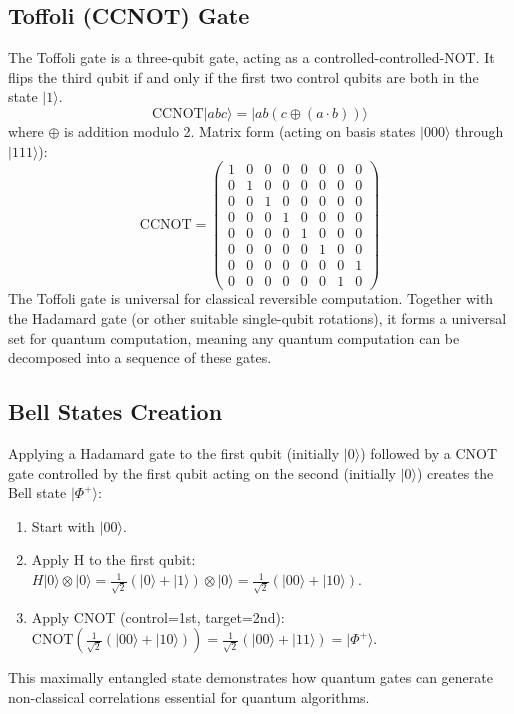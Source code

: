 \subsection*{Toffoli (CCNOT) Gate}
The Toffoli gate is a three-qubit gate, acting as a controlled-controlled-NOT. It flips the third qubit if and only if the first two control qubits are both in the state $|1\rangle$.
\begin{equation*}
    \text{CCNOT}|abc\rangle = |ab(c\oplus(a\cdot b))\rangle
\end{equation*}
where $\oplus$ is addition modulo 2.
Matrix form (acting on basis states $|000\rangle$ through $|111\rangle$):
\begin{equation*}
    \text{CCNOT} = \begin{pmatrix}
    1&0&0&0&0&0&0&0 \\
    0&1&0&0&0&0&0&0 \\
    0&0&1&0&0&0&0&0 \\
    0&0&0&1&0&0&0&0 \\
    0&0&0&0&1&0&0&0 \\
    0&0&0&0&0&1&0&0 \\
    0&0&0&0&0&0&0&1 \\ %
    0&0&0&0&0&0&1&0  %
    \end{pmatrix}
\end{equation*}
The Toffoli gate is universal for classical reversible computation. Together with the Hadamard gate (or other suitable single-qubit rotations), it forms a universal set for quantum computation, meaning any quantum computation can be decomposed into a sequence of these gates.

\subsection*{Bell States Creation}
Applying a Hadamard gate to the first qubit (initially $|0\rangle$) followed by a CNOT gate controlled by the first qubit acting on the second (initially $|0\rangle$) creates the Bell state $|\Phi^+\rangle$:
\begin{enumerate}
    \item Start with $|00\rangle$.
    \item Apply H to the first qubit: $H|0\rangle \otimes |0\rangle = \frac{1}{\sqrt{2}}(|0\rangle + |1\rangle) \otimes |0\rangle = \frac{1}{\sqrt{2}}(|00\rangle + |10\rangle)$.
    \item Apply CNOT (control=1st, target=2nd): $\text{CNOT} \left( \frac{1}{\sqrt{2}}(|00\rangle + |10\rangle) \right) = \frac{1}{\sqrt{2}}(|00\rangle + |11\rangle) = |\Phi^+\rangle$.
\end{enumerate}
This maximally entangled state demonstrates how quantum gates can generate non-classical correlations essential for quantum algorithms.

